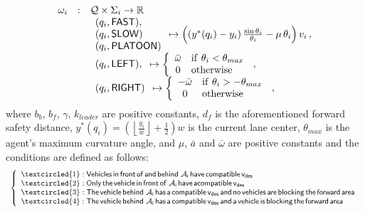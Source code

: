 \begin{equation*}
\begin{array}{rcl}
\omega_i  & : & \Q \times \Sigma_i \rightarrow \real \\
& & \begin{array}{l} (q_i, \mfast), \\ (q_i, \mslow) \\ (q_i, \mplatoon) \end{array}
\mapsto 
\left( \left( y^*(q_i) - y_i \right) \frac{\sin\theta_i}{\theta_i} - \mu \, \theta_i \right) v_i \, , \\
& &  \begin{array}{l}  (q_i, \mleft), \end{array} \mapsto 
\left \lbrace
\begin{array}{cl}
\bar{\omega} & \mathrm{if} \ \theta_i < \theta_{max} \\
0 & \mathrm{otherwise}
\end{array}
\right. \, , 
\\
& &  \begin{array}{l} (q_i, \mright)  \end{array} \mapsto 
\left \lbrace
\begin{array}{cl}
-\bar{\omega} & \mathrm{if} \ \theta_i > - \theta_{max} \\
0 & \mathrm{otherwise}
\end{array}
\right. \, ,
\end{array} 
\end{equation*}
{\color{red} where $b_b$, $b_f$, $\gamma$, $k_{leader}$ are positive constants, $d_f$ is the aforementioned forward safety distance}, $y^*(q_i) = \left( \left\lfloor \frac{y_i}{w} \right\rfloor + \frac{1}{2} \right) w$ is the current lane center, $\theta_{max}$ is the agent's maximum curvature angle, and $\mu$, $\bar{a}$ and $\bar{\omega}$ are positive constants {\color{red}and the conditions are defined as follows:}
\begin{equation*}
\begin{array}{cl}
\left \lbrace 
\begin{array}{l}
\textcircled{1}: \mathsf{Vehicles \, in \, front \, of \, and \, behind~\ai \, have \, compatible \, v_{des}\,} \\
\textcircled{2}: \mathsf{Only \, the \, vehicle \, in \, front \, of ~\ai \, have \, a compatible \, v_{des}\,}\\
\textcircled{3}: \mathsf{The \, vehicle \, behind~\ai \, has \, a \, compatible \, v_{des}\, and \, no \, vehicles \, are \, blocking \, the \, forward \, area}\\
\textcircled{4}: \mathsf{The \, vehicle \, behind~\ai \, has \, a \, compatible \, v_{des}\, and \, a \, vehicle \, is \, blocking \, the \, forward \, area}
\end{array}
\right.
\end{array}
\end{equation*}


